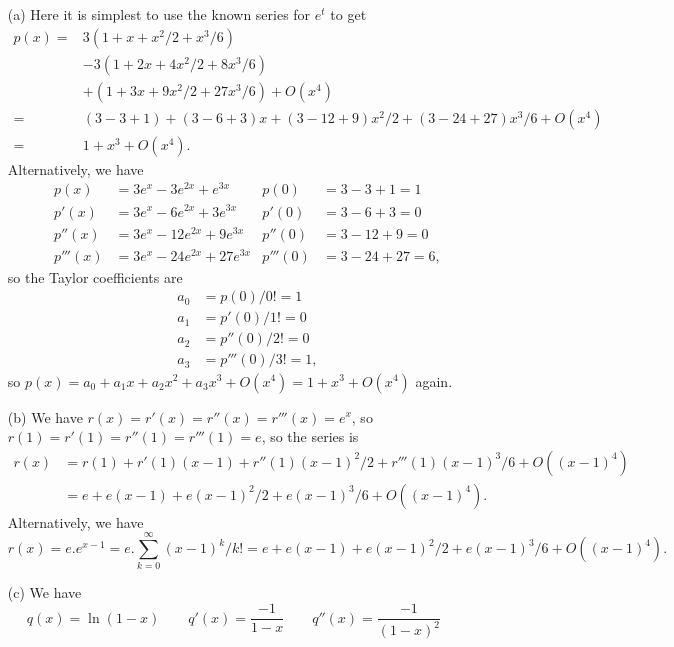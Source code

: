 \documentclass[a4paper]{amsart}
\theoremstyle{definition}
\newenvironment{solution}{{\noindent \bf Solution:}}{}
\begin{document}
\begin{solution}
 \begin{itemize}
  \item[(a)] Here it is simplest to use the known series for
   $e^t$ to get
   \begin{align*}
    p(x) =& 3(1 + x + x^2/2 + x^3/6) \\
          & -3(1 + 2x + 4x^2/2 + 8x^3/6) \\
          & + (1 + 3x + 9x^2/2 + 27x^3/6) + O(x^4) \\
         =& (3-3+1) + (3-6+3)x + (3-12+9)x^2/2 +
             (3-24+27)x^3/6 +O(x^4) \\
         =& 1 + x^3 + O(x^4).
   \end{align*}
   Alternatively, we have
   \begin{align*}
    p(x) &= 3e^x-3e^{2x}+e^{3x} & p(0) &= 3-3+1 = 1 \\
    p'(x) &= 3e^x-6e^{2x}+3e^{3x} & p'(0) &= 3-6+3=0 \\
    p''(x) &= 3e^x-12e^{2x}+9e^{3x} & p''(0) &= 3-12+9=0 \\
    p'''(x) &= 3e^x-24e^{2x}+27e^{3x} & p'''(0) &= 3-24+27=6,
   \end{align*}
   so the Taylor coefficients are 
   \begin{align*}
    a_0 &= p(0)/0! = 1 \\
    a_1 &= p'(0)/1! = 0 \\
    a_2 &= p''(0)/2! = 0 \\
    a_3 &= p'''(0)/3! = 1,
   \end{align*}
   so $p(x)=a_0+a_1x+a_2x^2+a_3x^3+O(x^4)=1+x^3+O(x^4)$ again.
  \item[(b)]
   We have $r(x)=r'(x)=r''(x)=r'''(x)=e^x$, so
   $r(1)=r'(1)=r''(1)=r'''(1)=e$, so the series is
   \begin{align*}
    r(x)
     &= r(1) + r'(1)(x-1) +
        r''(1)(x-1)^2/2 + r'''(1)(x-1)^3/6 +
        O((x-1)^4) \\
     &= e + e(x-1) + e(x-1)^2/2 + e(x-1)^3/6 + O((x-1)^4).
   \end{align*}
   Alternatively, we have 
   \[ r(x)=e.e^{x-1}=e.\sum_{k=0}^\infty(x-1)^k/k! = 
      e + e(x-1) + e(x-1)^2/2 + e(x-1)^3/6 + O((x-1)^4).
   \]
  \item[(c)]
   We have 
   \[ q(x) = \ln(1-x) \hspace{2em}
      q'(x) = \frac{-1}{1-x} \hspace{2em}
      q''(x) = \frac{-1}{(1-x)^2} \hspace{2em}
\]
\end{itemize}
\end{solution}
\end{document}
